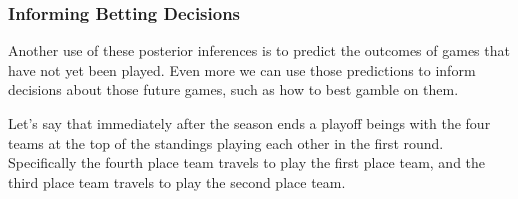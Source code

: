 \documentclass[
  letterpaper,
  DIV=11,
  numbers=noendperiod]{scrartcl}
\begin{document}
\subsubsection{Informing Betting
Decisions}\label{informing-betting-decisions}

Another use of these posterior inferences is to predict the outcomes of
games that have not yet been played. Even more we can use those
predictions to inform decisions about those future games, such as how to
best gamble on them.

Let's say that immediately after the season ends a playoff beings with
the four teams at the top of the standings playing each other in the
first round. Specifically the fourth place team travels to play the
first place team, and the third place team travels to play the second
place team.
\end{document}
